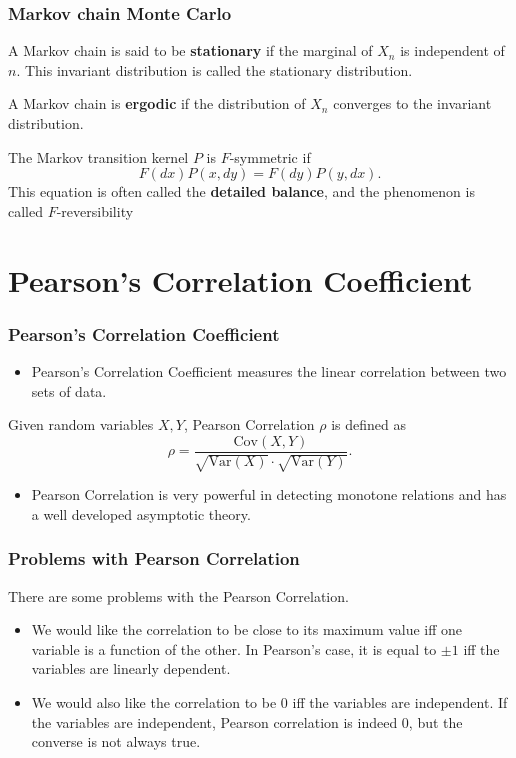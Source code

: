 \documentclass [xcolor=svgnames, t] {beamer}
\begin{document}
\begin{frame}
    \frametitle{Markov chain Monte Carlo}
    \begin{definition}
        A Markov chain is said to be \textbf{stationary} if the marginal of $X_n$ is independent of $n$. This invariant distribution is called the stationary distribution.
    \end{definition}
    \begin{definition}
        A Markov chain is \textbf{ergodic} if the distribution of $X_n$ converges to the invariant distribution.
    \end{definition}
    \begin{definition}
        The Markov transition kernel $P$ is $F$-symmetric if
        $$F(dx)P(x, dy) = F(dy)P(y, dx).$$
        This equation is often called the \textbf{detailed balance}, and the phenomenon is called $F$-reversibility
    \end{definition}
\end{frame}

\section{Pearson's Correlation Coefficient}
\begin{frame}
    \frametitle{Pearson's Correlation Coefficient}
    \begin{itemize}
        \item Pearson's Correlation Coefficient measures the linear correlation between two sets of data.
    \end{itemize}
    \vspace{2em}
    \begin{definition}
        Given random variables $X, Y$, Pearson Correlation $\rho$ is defined as
        $$\rho = \frac{\text{Cov}(X, Y)}{\sqrt{\text{Var}(X)} \cdot \sqrt{\text{Var}(Y)}}.$$
    \end{definition}
    \vspace{2em}
    \begin{itemize}
        \item Pearson Correlation is very powerful in detecting monotone relations and has a well developed asymptotic theory.
    \end{itemize}
\end{frame}
\begin{frame}
    \frametitle{Problems with Pearson Correlation}
    There are some problems with the Pearson Correlation.
    \vspace{2em}
    \begin{itemize}
        \item We would like the correlation to be close to its maximum value iff one variable is a function of the other.
        In Pearson's case, it is equal to $\pm 1$ iff the variables are linearly dependent.
        \vspace{2em}
        \item We would also like the correlation to be 0 iff the variables are independent.
        If the variables are independent, Pearson correlation is indeed 0, but the converse is not always true.
    \end{itemize}
\end{frame}
\end{document}
